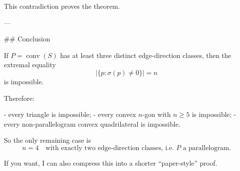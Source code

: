 This contradiction proves the theorem.

---

## Conclusion

If \(P=\operatorname{conv}(S)\) has at least three distinct edge-direction classes, then the extremal equality
\[
\bigl|\{p:\sigma(p)\neq 0\}\bigr|=n
\]
is impossible.

Therefore:

- every triangle is impossible;
- every convex \(n\)-gon with \(n\ge 5\) is impossible;
- every non-parallelogram convex quadrilateral is impossible.

So the only remaining case is
\[
n=4
\quad\text{with exactly two edge-direction classes, i.e. }P\text{ a parallelogram}.
\]

If you want, I can also compress this into a shorter “paper-style” proof.
